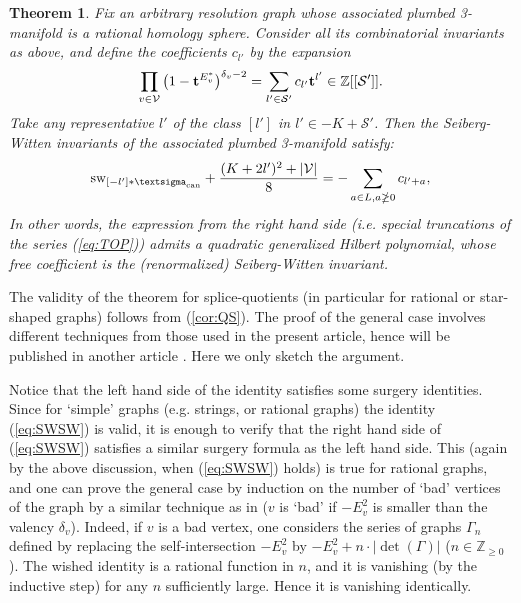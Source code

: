 \documentclass[10pt,a4paper]{amsart}
\numberwithin{equation}{section}
\numberwithin{equation}{subsection}
\theoremstyle{plain}
\newtheorem{theorem}[equation]{Theorem}
\theoremstyle{definition}
\begin{document}
\begin{theorem}
Fix an arbitrary resolution graph whose associated plumbed 3-manifold is 
a rational homology sphere. Consider all its combinatorial
invariants  as above, and  define  the coefficients $c_{l'}$ by the expansion
\begin{equation}\label{eq:TOP}
\prod_{v\in{\mathcal{V}}}
\big(1-{{\bf t}}^{E_v^*}\big)^{\delta_v-2}=\sum_{l'\in{\mathcal{S}}'}c_{l'}{{\bf t}}^{l'}\in{\mathbb{Z}}[[{\mathcal{S}}']].
\end{equation}
Take any representative $l'$ of the class $[l']$ in
$l'\in -K+{\mathcal{S}}'$. Then the Seiberg-Witten invariants of the
associated plumbed 3-manifold satisfy:
\begin{equation}\label{eq:SWSW}
  {\operatorname{sw}\sb{{[-l']*{\textsigma}_{\mathrm{can}}}}} +
    {\mathchoice
         \frac{{(K + 2 l')^2 + |{\mathcal{V}}|}}{{8}}   
  {\mathinner{{{(K + 2 l')^2 + |{\mathcal{V}}|}}/{{8}}}}
  {\mathinner{{{(K + 2 l')^2 + |{\mathcal{V}}|}}/{{8}}}}
  {\mathinner{{{(K + 2 l')^2 + |{\mathcal{V}}|}}/{{8}}}}
}= -\sum_{a \in L, a \ngeq 0}  c_{l'+a},
  \end{equation}
In other words, the expression from the right hand side (i.e.
special truncations of the series (\ref{eq:TOP})) admits a
quadratic generalized Hilbert polynomial, whose free coefficient
is the (renormalized) Seiberg-Witten invariant.
\end{theorem}
The validity of the theorem for splice-quotients (in particular
for rational or star-shaped graphs) follows from (\ref{cor:QS}).
The proof of the general case involves different techniques from
those used in the present article, hence will be published in
another article \cite{NSW}. Here we only sketch the argument.

Notice that the left hand side of the identity satisfies some surgery
identities. Since for `simple' graphs (e.g.
strings, or rational graphs) the identity (\ref{eq:SWSW}) is valid, 
it is enough to
verify that the right hand side of (\ref{eq:SWSW}) satisfies a
similar surgery formula as the left hand side. This (again by the
above discussion, when (\ref{eq:SWSW}) holds)
is true for rational graphs, and one can prove
the general case by induction on the number of `bad' vertices of
the graph  by a similar technique as in \cite{NO2}
($v$ is `bad' if $-E_v^2$ is smaller than the valency
$\delta_v$). Indeed, if
$v$ is a bad vertex, one considers the series of graphs $\Gamma_n$
defined by replacing the self-intersection $-E^2_v$ by
$-E^2_v+n\cdot |\det(\Gamma)|$ ($n\in{\mathbb{Z}}_{\geq 0}$). The wished
identity is a rational function in $n$, and it is vanishing (by
the inductive step) for any $n$ sufficiently large. Hence it is
vanishing identically.
\end{document}
